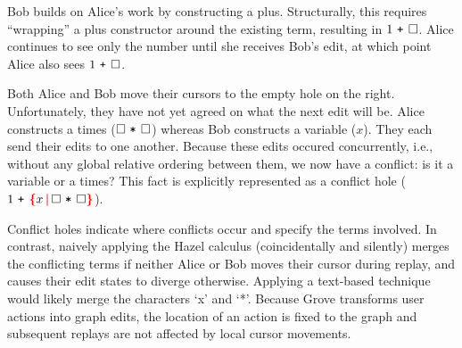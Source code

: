 \documentclass[nonacm, acmsmall, screen, review]{acmart}
\newcommand{\id}[1]{\textcolor{gray}{\ensuremath{#1}}}
\newcommand{\eid}[2]{{#2}^{\id{#1}}}
\newcommand{\ePlus}[3]{#2~\eid{#1}{\texttt{+}}~#3}
\newcommand{\eTimes}[3]{#2~\eid{#1}{\texttt{*}}~#3}
\newcommand{\hole}{\ensuremath{\square}} %
\newcommand{\conflictHole}[1]{%
{\noexpandarg\StrSubstitute{#1}{,}{\textcolor{red}{\,\textbf{|}\,}}[\myargs]%
{\textcolor{red}{\textbf{\{}}\myargs\textcolor{red}{\textbf{\}}}}}}%
\begin{document}
Bob builds on Alice's work by constructing a plus.
Structurally, this requires ``wrapping'' a plus constructor around the existing term, resulting in $\ePlus{}{1}{\hole}$.
Alice continues to see only the number until she receives Bob's edit,
at which point Alice also sees $\ePlus{}{1}{\hole}$.





Both Alice and Bob move their cursors to the empty hole on the right.
Unfortunately, they have not yet agreed on what the next edit will be.
Alice constructs a times ($\eTimes{}{\hole}{\hole}$) whereas Bob constructs a variable ($x$).
They each send their edits to one another.
Because these edits occured concurrently, i.e., without any global relative ordering between them, we now have a conflict: is it a variable or a times?
This fact is explicitly represented as a conflict hole ($\ePlus{}{1}{\conflictHole{x, \eTimes{}{\hole}{\hole}}}$).

Conflict holes indicate where conflicts occur and specify the terms involved.
In contrast, naively applying the Hazel calculus (coincidentally and silently) merges the conflicting terms if neither Alice or Bob moves their cursor during replay, 
and causes their edit states to diverge otherwise.
Applying a text-based technique would likely merge the characters `x' and `*'.
Because Grove transforms user actions into graph edits, the location of an action is fixed to the graph and subsequent replays are not affected by local cursor movements.
\end{document}
